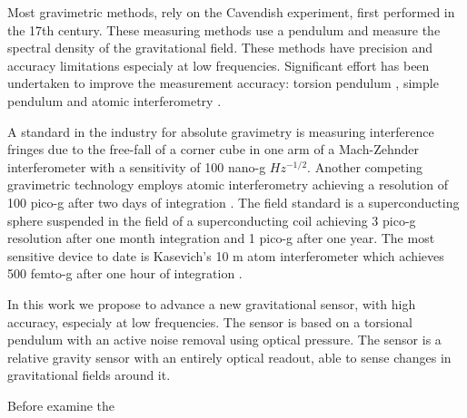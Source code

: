 \documentclass[\main/master.tex]{subfiles}
\begin{document}
\par
Most gravimetric methods, rely on the Cavendish experiment, first performed in the 17th century. These measuring methods use a pendulum and measure the spectral density of the gravitational field. These methods have precision and accuracy limitations especialy at low frequencies. Significant effort has been undertaken to improve the measurement accuracy: torsion pendulum \cite{Luther82,Kuroda95,Karagioz96,Bagley97,Gundlach00,Quinn01,Armstrong03}, simple pendulum \cite {Kleinevoss99,Parks10} and atomic interferometry \cite{Lamporesi08,Sorrentino10,Rosi14}.
\par
A standard in the industry for absolute gravimetry is measuring interference fringes due to the free-fall of a corner cube in one arm of a Mach-Zehnder interferometer with a sensitivity of 100 nano-g $Hz^{-1/2}$. Another competing gravimetric technology employs atomic interferometry achieving a resolution of 100 pico-g after two days of integration \cite{Peters01}. 
The field standard is a superconducting sphere suspended in the field of a superconducting coil achieving 3 pico-g resolution \cite{Goodkind99} after one month integration and 1 pico-g  after one year. 
The most sensitive device to date is Kasevich's 10 m atom interferometer which achieves 500 femto-g after one hour of integration \cite{PhysRevA.91.033629,kasevich2014prospects}. 
\par
In this work we propose to advance a new gravitational sensor, with high accuracy, especialy at low frequencies. The sensor is based on a torsional pendulum with an active noise removal using optical pressure. The sensor is a relative gravity sensor with an entirely optical readout, able to sense changes in gravitational fields around it. 
\par
Before examine the 



\end{document}
